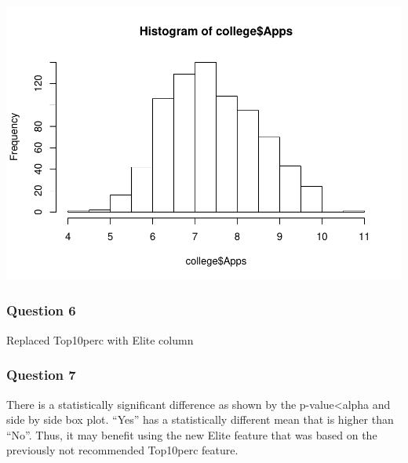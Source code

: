 \documentclass[]{article}
\newenvironment{Shaded}{\begin{snugshade}}{\end{snugshade}}
\newcommand{\ConstantTok}[1]{\textcolor[rgb]{0.00,0.00,0.00}{#1}}
\newcommand{\DecValTok}[1]{\textcolor[rgb]{0.00,0.00,0.81}{#1}}
\newcommand{\FunctionTok}[1]{\textcolor[rgb]{0.00,0.00,0.00}{#1}}
\newcommand{\NormalTok}[1]{#1}
\newcommand{\OtherTok}[1]{\textcolor[rgb]{0.56,0.35,0.01}{#1}}
\newcommand{\SpecialCharTok}[1]{\textcolor[rgb]{0.00,0.00,0.00}{#1}}
\newcommand{\StringTok}[1]{\textcolor[rgb]{0.31,0.60,0.02}{#1}}
\begin{document}
\includegraphics{assignment3_files/figure-latex/unnamed-chunk-6-1.pdf}

\hypertarget{question-6}{%
\subsubsection{Question 6}\label{question-6}}

Replaced Top10perc with Elite column

\begin{Shaded}
\end{Shaded}

\hypertarget{question-7}{%
\subsubsection{Question 7}\label{question-7}}

There is a statistically significant difference as shown by the
p-value\textless alpha and side by side box plot. ``Yes'' has a
statistically different mean that is higher than ``No''. Thus, it may
benefit using the new Elite feature that was based on the previously not
recommended Top10perc feature.
\end{document}
